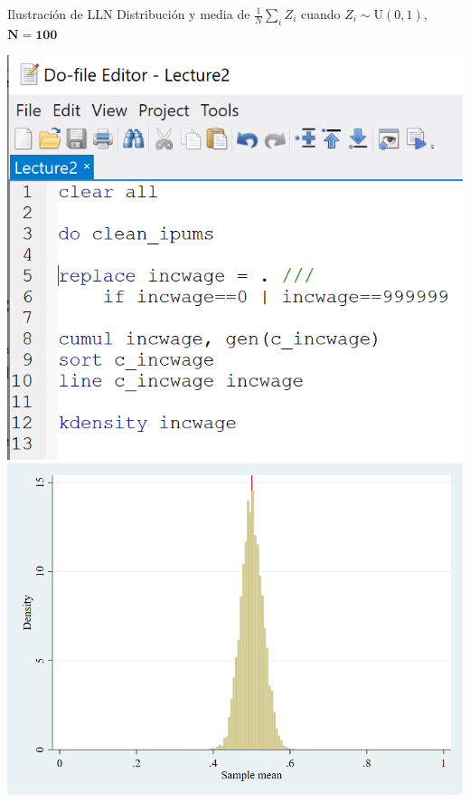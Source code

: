 \documentclass[11pt,handout,aspectratio=169]{beamer}
\begin{document}
\begin{frame}{Ilustración de LLN}
	\vspace{0.2cm}
	Distribución y media de $\frac{1}{N}\sum_i Z_i$ cuando $Z_i\sim \mathrm{U}(0,1)$, $\mathbf{N=100}$
	
	\begin{center}
		\includegraphics[scale=0.4]{Stata7.png} \includegraphics[scale=0.25]{sims100_2.png}
	\end{center}
	
\end{frame}
\end{document}
